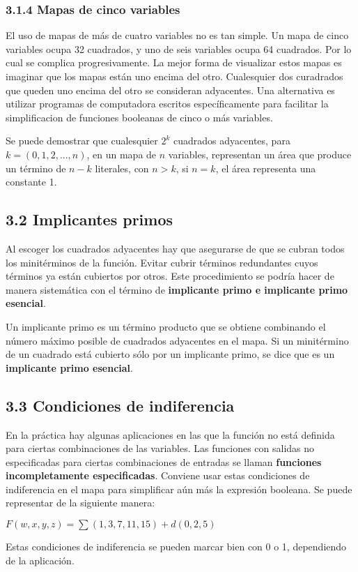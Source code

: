 \subsubsection*{3.1.4 Mapas de cinco variables} El uso de mapas de m\'{a}s de
cuatro variables no es tan simple. Un mapa de cinco variables ocupa 32 cuadrados,
y uno de seis variables ocupa 64 cuadrados. Por lo cual se complica
progresivamente. La mejor forma de visualizar estos mapas es imaginar que los
mapas est\'{a}n uno encima del otro. Cualesquier dos curadrados que queden uno
encima del otro se consideran adyacentes. Una alternativa es utilizar programas
de computadora escritos espec\'{i}ficamente para facilitar la simplificacion de
funciones booleanas de cinco o m\'{a}s variables.

Se puede demostrar que cualesquier $2^k$ cuadrados adyacentes, para $k = (0, 1,
    2, ..., n)$, en un mapa de $n$ variables, representan un \'{a}rea que produce un
t\'{e}rmino de $n - k$ literales, con $n > k$, si $n = k$, el \'{a}rea
representa una constante 1.

\subsection*{3.2 Implicantes primos} Al escoger los cuadrados adyacentes hay
que asegurarse de que se cubran todos los minit\'{e}rminos de la funci\'{o}n.
Evitar cubrir t\'{e}rminos redundantes cuyos t\'{e}rminos ya est\'{a}n cubiertos
por otros. Este procedimiento se podr\'{i}a hacer de manera sistem\'{a}tica con
el t\'{e}rmino de \textbf{implicante primo e implicante primo esencial}.

Un implicante primo es un t\'{e}rmino producto que se obtiene combinando el
n\'{u}mero m\'{a}ximo posible de cuadrados adyacentes en el mapa. Si un
minit\'{e}rmino de un cuadrado est\'{a} cubierto s\'{o}lo por un implicante
primo, se dice que es un \textbf{implicante primo esencial}.

\subsection*{3.3 Condiciones de indiferencia} En la pr\'{a}ctica hay algunas
aplicaciones en las que la funci\'{o}n no est\'{a} definida para ciertas
combinaciones de las variables. Las funciones con salidas no especificadas para
ciertas combinaciones de entradas se llaman \textbf{funciones incompletamente
    especificadas}. Conviene usar estas condiciones de indiferencia en el mapa para
simplificar a\'{u}n m\'{a}s la expresi\'{o}n booleana. Se puede representar de
la siguiente manera: \begin{center} $F(w, x, y, z) = \sum (1, 3, 7, 11, 15) +
        d(0, 2, 5)$ \end{center} Estas condiciones de indiferencia se pueden marcar bien
con 0 o 1, dependiendo de la aplicaci\'{o}n.

